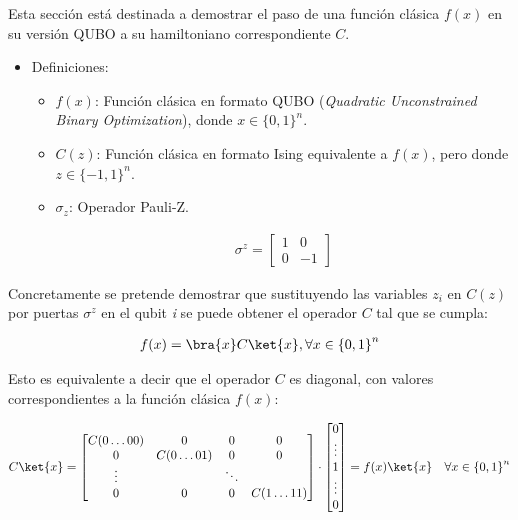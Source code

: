 Esta sección está destinada a demostrar el paso de una función clásica $f(x)$ en su versión QUBO a su hamiltoniano correspondiente $C$.

\begin{itemize}
\item Definiciones:
  \begin{itemize}
  \item $f(x)$: Función clásica en formato QUBO (\textit{Quadratic Unconstrained Binary Optimization}), donde $x \in {\{0 , 1\}}^n$.

  \item $C(z)$: Función clásica en formato Ising equivalente a $f(x)$, pero donde $z \in {\{-1 , 1\}}^n$.

  \item $\sigma_z$: Operador Pauli-Z.

    \begin{align}
      \sigma^z = \begin{bmatrix}
        1 & 0 \\
        0 & -1
      \end{bmatrix}
    \end{align}
  \end{itemize}
\end{itemize}

Concretamente se pretende demostrar que sustituyendo las variables $z_i$ en $C(z)$ por puertas $\sigma^z$ en el qubit \textit{i} se puede obtener el operador $C$ tal que se cumpla:

\begin{align}
  f(x) = \bra{x} C \ket{x}, \forall{x \in {\{0, 1\}}^n}
\end{align}

Esto es equivalente a decir que el operador $C$ es diagonal, con valores correspondientes a la función clásica $f(x)$:

\begin{align}
  &C \ket{x} = \begin{bmatrix}
    C(0 \ldots 00) & 0          & 0  & 0 \\
    0          & C(0 \ldots 01) & 0  & 0 \\
    \vdots         &            & \ddots &   \\
    0          & 0          & 0  & C(1 \ldots 11)
  \end{bmatrix} \cdot
  \begin{bmatrix}
    0  \\
    \vdots \\
    1  \\
    \vdots \\
    0
  \end{bmatrix} = f(x) \ket{x} & \forall x \in {\{0, 1\}}^n
\end{align}

